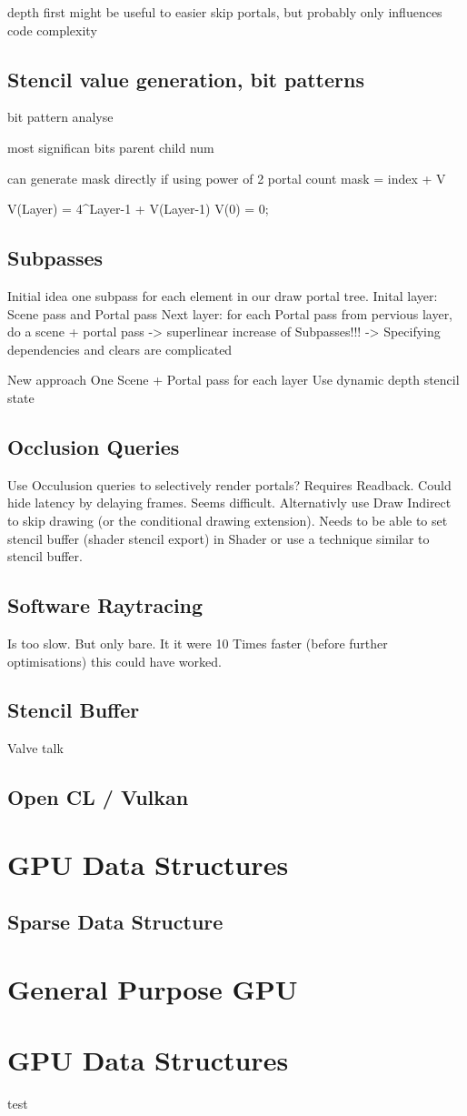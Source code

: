 depth first might be useful to easier skip portals, but probably only influences code complexity

\subsection{Stencil value generation, bit patterns}
bit pattern analyse

most significan bits parent child num

can generate mask directly if using power of 2 portal count
mask = index + V

V(Layer) = 4^{Layer-1} + V(Layer-1)
V(0) = 0;

\subsection{Subpasses}
Initial idea one subpass for each element in our draw portal tree.
Inital layer: Scene pass and Portal pass
Next layer: for each Portal pass from pervious layer, do a scene + portal pass
-> superlinear increase of Subpasses!!!
-> Specifying dependencies and clears are complicated

New approach
One Scene + Portal pass for each layer
Use dynamic depth stencil state


\subsection{Occlusion Queries}
Use Occulusion queries to selectively render portals? Requires Readback. Could hide latency by delaying frames. Seems difficult.
Alternativly use Draw Indirect to skip drawing (or the conditional drawing extension). Needs to be able to set stencil buffer (shader stencil export) in Shader or use a technique similar to stencil buffer.


\subsection{Software Raytracing}
Is too slow. But only bare. It it were 10 Times faster (before further optimisations) this could have worked.


\subsection{Stencil Buffer}
Valve talk

\subsection{Open CL / Vulkan}
\section{GPU Data Structures}
\subsection{Sparse Data Structure}

\section{General Purpose GPU}

\section{GPU Data Structures}

test \cite{Heuser:2003}